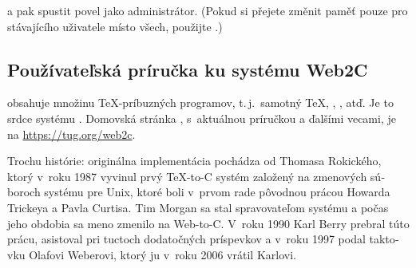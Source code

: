 \documentclass[\classoptions,slovak,english,czech]{\classname}
\begin{document}
\noindent a pak spustit povel  jako
administrátor.  (Pokud si přejete změnit paměť pouze pro
stávajícího uživatele místo všech, použijte .)


\begin{otherlanguage}{slovak}
\frenchspacing
\section{Používateľská príručka ku systému Web2C}
\Webc{} obsahuje množinu \TeX-príbuzných programov, t.\,j.\ samotný \TeX{},
\MF{}, \MP, \BibTeX{} atď. Je to srdce systému \TL{}. 
Domovská stránka \Webc{}, s~aktuálnou príručkou a ďalšími vecami, je na
\url{https://tug.org/web2c}. 

Trochu histórie: originálna implementácia pochádza
od Thomasa Rokického, ktorý v~roku 1987 vyvinul prvý
\TeX{}-to-C systém založený na zmenových súboroch systému pre Unix, ktoré
boli v~prvom rade pôvodnou prácou Howarda Trickeya a Pavla Curtisa.
Tim Morgan sa stal spravovateľom systému a počas jeho obdobia sa meno zmenilo
na Web-to-C\@. V~roku 1990 Karl Berry prebral túto prácu,
asistoval pri tuctoch dodatočných príspevkov a v~roku 1997 podal
taktovku Olafovi Weberovi, ktorý ju v~roku 2006 vrátil Karlovi.


\end{otherlanguage}
\end{document}
